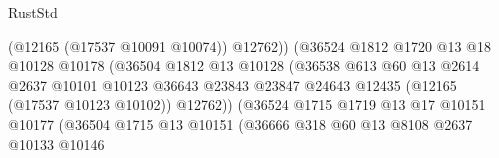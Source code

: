 \begin{lexlean}{RustStd}
\begin{coremodule}
                                                (@12165 (@17537 @10091 @10074))
                                                @12762))
                                            (@36524
                                              @1812
                                              @1720
                                              @13
                                              @18
                                              @10128
                                              @10178
                                              (@36504
                                                @1812
                                                @13
                                                @10128
                                                (@36538
                                                  @613
                                                  @60
                                                  @13
                                                  @2614
                                                  @2637
                                                  @10101
                                                  @10123
                                                  @36643
                                                  @23843
                                                  @23847
                                                  @24643
                                                  @12435
                                                  (@12165 (@17537 @10123 @10102))
                                                  @12762))
                                              (@36524
                                                @1715
                                                @1719
                                                @13
                                                @17
                                                @10151
                                                @10177
                                                (@36504
                                                  @1715
                                                  @13
                                                  @10151
                                                  (@36666
                                                    @318
                                                    @60
                                                    @13
                                                    @8108
                                                    @2637
                                                    @10133
                                                    @10146

\end{coremodule}
\end{lexlean}
